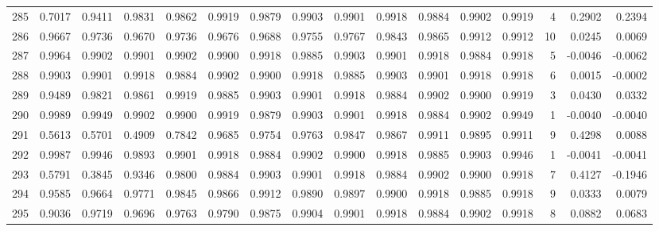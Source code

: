 \begin{tabular}{lrrrrrrrrrrrrrrr}
285 &      0.7017 &  0.9411 &  0.9831 &  0.9862 &  0.9919 &  0.9879 &  0.9903 &  0.9901 &  0.9918 &  0.9884 &   0.9902 &     0.9919 &      4 &                    0.2902 &                     0.2394 \\
286 &      0.9667 &  0.9736 &  0.9670 &  0.9736 &  0.9676 &  0.9688 &  0.9755 &  0.9767 &  0.9843 &  0.9865 &   0.9912 &     0.9912 &     10 &                    0.0245 &                     0.0069 \\
287 &      0.9964 &  0.9902 &  0.9901 &  0.9902 &  0.9900 &  0.9918 &  0.9885 &  0.9903 &  0.9901 &  0.9918 &   0.9884 &     0.9918 &      5 &                   -0.0046 &                    -0.0062 \\
288 &      0.9903 &  0.9901 &  0.9918 &  0.9884 &  0.9902 &  0.9900 &  0.9918 &  0.9885 &  0.9903 &  0.9901 &   0.9918 &     0.9918 &      6 &                    0.0015 &                    -0.0002 \\
289 &      0.9489 &  0.9821 &  0.9861 &  0.9919 &  0.9885 &  0.9903 &  0.9901 &  0.9918 &  0.9884 &  0.9902 &   0.9900 &     0.9919 &      3 &                    0.0430 &                     0.0332 \\
290 &      0.9989 &  0.9949 &  0.9902 &  0.9900 &  0.9919 &  0.9879 &  0.9903 &  0.9901 &  0.9918 &  0.9884 &   0.9902 &     0.9949 &      1 &                   -0.0040 &                    -0.0040 \\
291 &      0.5613 &  0.5701 &  0.4909 &  0.7842 &  0.9685 &  0.9754 &  0.9763 &  0.9847 &  0.9867 &  0.9911 &   0.9895 &     0.9911 &      9 &                    0.4298 &                     0.0088 \\
292 &      0.9987 &  0.9946 &  0.9893 &  0.9901 &  0.9918 &  0.9884 &  0.9902 &  0.9900 &  0.9918 &  0.9885 &   0.9903 &     0.9946 &      1 &                   -0.0041 &                    -0.0041 \\
293 &      0.5791 &  0.3845 &  0.9346 &  0.9800 &  0.9884 &  0.9903 &  0.9901 &  0.9918 &  0.9884 &  0.9902 &   0.9900 &     0.9918 &      7 &                    0.4127 &                    -0.1946 \\
294 &      0.9585 &  0.9664 &  0.9771 &  0.9845 &  0.9866 &  0.9912 &  0.9890 &  0.9897 &  0.9900 &  0.9918 &   0.9885 &     0.9918 &      9 &                    0.0333 &                     0.0079 \\
295 &      0.9036 &  0.9719 &  0.9696 &  0.9763 &  0.9790 &  0.9875 &  0.9904 &  0.9901 &  0.9918 &  0.9884 &   0.9902 &     0.9918 &      8 &                    0.0882 &                     0.0683 \\

\end{tabular}
